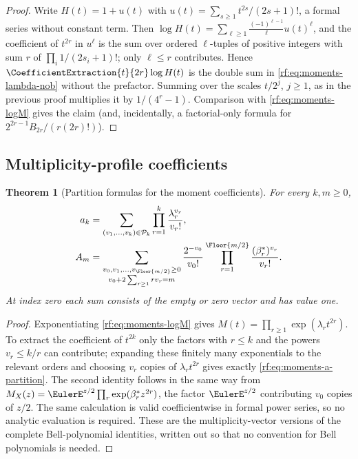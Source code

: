 \documentclass[11pt,oneside]{article}
\theoremstyle{plain}
\newtheorem{theorem}{Theorem}[section]
\theoremstyle{definition}
\theoremstyle{remark}
\newcommand{\coeff}[2]{\CoefficientExtraction{#1}{#2}}
\newcommand{\Prof}[1]{\mathcal{P}_{#1}}     %
\begin{document}
\begin{proof}
Write $H(t)=1+u(t)$ with $u(t)=\sum_{s\ge1}t^{2s}/(2s+1)!$, a formal series
without constant term.  Then
$\log H(t)=\sum_{\ell\ge1}\frac{(-1)^{\ell-1}}{\ell}u(t)^{\ell}$, and the
coefficient of $t^{2r}$ in $u^{\ell}$ is the sum over ordered
$\ell$-tuples of positive integers with sum $r$ of
$\prod_{i}1/(2s_{i}+1)!$; only $\ell\le r$ contributes.  Hence
$\coeff{t}{2r}\log H(t)$ is the double sum in
\cref{rf:eq:moments-lambda-nob} without the prefactor.  Summing over the
scales $t/2^{j}$, $j\ge1$, as in the previous proof multiplies it by
$1/(4^{r}-1)$.  Comparison with \cref{rf:eq:moments-logM} gives the claim
(and, incidentally, a factorial-only formula for $2^{2r-1}B_{2r}/(r(2r)!)$).
\end{proof}

\subsection{Multiplicity-profile coefficients}
\label{rf:sec:moments-partitions}

\begin{theorem}[Partition formulas for the moment coefficients]
\label{rf:thm:moments-partition}
For every $k,m\ge0$,
\begin{align}
 a_{k}&=\sum_{(v_{1},\ldots,v_{k})\in\Prof{k}}
        \prod_{r=1}^{k}\frac{\lambda_{r}^{v_{r}}}{v_{r}!},
 \label{rf:eq:moments-a-partition}\\
 A_{m}&=\sum_{\substack{v_{0},v_{1},\ldots,v_{\Floor{m/2}}\ge0\\
                        v_{0}+2\sum_{r\ge1}rv_{r}=m}}
        \frac{2^{-v_{0}}}{v_{0}!}
        \prod_{r=1}^{\Floor{m/2}}\frac{(\beta^{\ast}_{r})^{v_{r}}}{v_{r}!}.
 \label{rf:eq:moments-A-partition}
\end{align}
At index zero each sum consists of the empty or zero vector and has value
one.
\end{theorem}

\begin{proof}
Exponentiating \cref{rf:eq:moments-logM} gives
$M(t)=\prod_{r\ge1}\exp(\lambda_{r}t^{2r})$.  To extract the coefficient of
$t^{2k}$ only the factors with $r\le k$ and the powers $v_{r}\le k/r$ can
contribute; expanding these finitely many exponentials to the relevant
orders and choosing $v_{r}$ copies of $\lambda_{r}t^{2r}$ gives exactly
\cref{rf:eq:moments-a-partition}.  The second identity follows in the same
way from $M_{X}(z)=\EulerE^{z/2}\prod_{r}\exp(\beta^{\ast}_{r}z^{2r})$, the
factor $\EulerE^{z/2}$ contributing $v_{0}$ copies of $z/2$.  The same
calculation is valid coefficientwise in formal power series, so no analytic
evaluation is required.  These are the multiplicity-vector versions of the
complete Bell-polynomial identities, written out so that no convention for
Bell polynomials is needed.
\end{proof}
\end{document}

